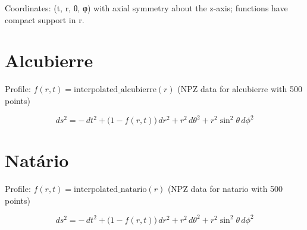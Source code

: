 \documentclass{article}
\begin{document}
Coordinates: (t, r, θ, φ) with axial symmetry about the z-axis; functions have compact support in r.

\section*{Alcubierre}
Profile: \(f(r,t) = \mathrm{interpolated\_alcubierre}(r)\) (NPZ data for alcubierre with 500 points)

\[
ds^2 = -\,dt^2 + \bigl(1 - f(r,t)\bigr)\,dr^2 + r^2\,d\theta^2 + r^2\sin^2\theta\,d\phi^2
\]

\section*{Natário}
Profile: \(f(r,t) = \mathrm{interpolated\_natario}(r)\) (NPZ data for natario with 500 points)

\[
ds^2 = -\,dt^2 + \bigl(1 - f(r,t)\bigr)\,dr^2 + r^2\,d\theta^2 + r^2\sin^2\theta\,d\phi^2
\]
\end{document}
